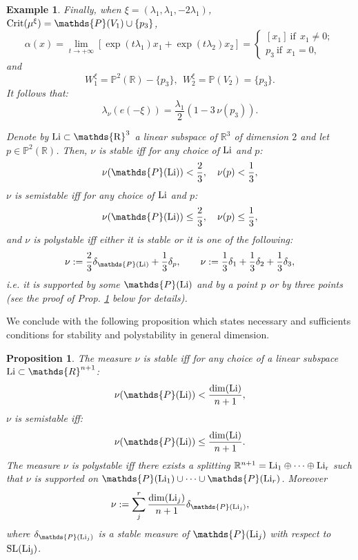 \documentclass[leqno,11pt, a4]{amsart}
\newtheorem{prop}[equation]{Proposition}
\newtheorem{Example}[equation]{Example}
\theoremstyle{named}
\begin{document}
\begin{Example}
Finally, when $\xi=(\lambda_1,\lambda_1,-2\lambda_1)$, ${\rm Crit}(\mu^\xi)=\mathds{P}(V_1)\cup\{p_3\}$,
\begin{equation}
 {\alpha}(x) =\lim_{t\to +\infty} [\exp(t\lambda_1)x_1+\exp(t\lambda_{2})x_{2}]=\begin{cases} [x_1]\  {\textrm{if}}\ \ x_1\neq 0;\\
p_3\  {\textrm{if}}\ \ x_1=0,
 \end{cases}\nonumber
\end{equation}
and
$$
W_1^\xi=\mathds{P}^2(\mathds{R}){-}\{p_3\},\ \  W_2^\xi=\mathds{P}(V_2)=\{p_3\}.
$$
It follows that:
$$
\lambda_\nu(e(-\xi))=\frac{\lambda_1}2\left(1-3\,\nu (p_3)\right).
$$

Denote by $\rm Li\subset \mathds{R}^3$ a linear subspace of $\mathds{R}^3$ of dimension $2$ and let $p\in \mathds{P}^2(\mathds{R})$.
Then, $\nu$ is stable iff for any choice of ${\rm Li}$ and $p$:
$$
\nu(\mathds{P}({\rm Li}))<\frac23,\quad \nu(p)<\frac13,
$$
$\nu$ is semistable iff for any choice of ${\rm Li}$ and $p$:
$$
\nu(\mathds{P}({\rm Li}))\leq\frac23,\quad \nu(p)\leq\frac13,
$$
and $\nu$ is polystable iff either it is stable or it is one of the following:
$$
\nu:=\frac23\delta_{\mathds{P}({\rm Li})}+\frac13\delta_p,\qquad \nu:=\frac{1}3\delta_{1}+\frac{1}3\delta_{2}+\frac{1}3\delta_{3},
$$
i.e. it is supported by some $\mathds{P}({\rm Li})$ and by a point $p$ or by three points (see the proof of Prop. \ref{projstab} below for details).

\end{Example}
We conclude with the following proposition which states necessary and sufficients conditions for stability and polystability in general dimension.
\begin{prop}\label{projstab}
The measure $\nu$ is stable iff for any choice of a linear subspace ${\rm Li}\subset \mathds{R}^{n+1}$:
$$
\nu(\mathds{P}({\rm Li}))<\frac{\dim({\rm Li})}{n+1},
$$
$\nu$ is semistable iff:
$$
\nu(\mathds{P}({\rm Li}))\leq\frac{\dim({\rm Li})}{n+1}.
$$
The measure  $\nu$ is polystable iff there exists a splitting ${\mathbb{R}}^{n+1}={\rm Li_1} \oplus \cdots \oplus {\rm Li_r}$ such that $\nu$ is supported on $\mathds{P}({\rm Li}_1)\cup \cdots \cup \mathds{P}({\rm Li}_r)$. Moreover
$$
\nu:=\sum_{j}^r\frac{\dim({\rm Li}_j)}{n+1}\delta_{\mathds{P}({\rm Li}_j)},
$$
where $\delta_{\mathds{P}({\rm Li}_j)}$ is a stable measure of $\mathds{P}({\rm Li}_j)$ with respect to $\rm{SL}({\rm Li}_j )$.
\end{prop}
\end{document}
